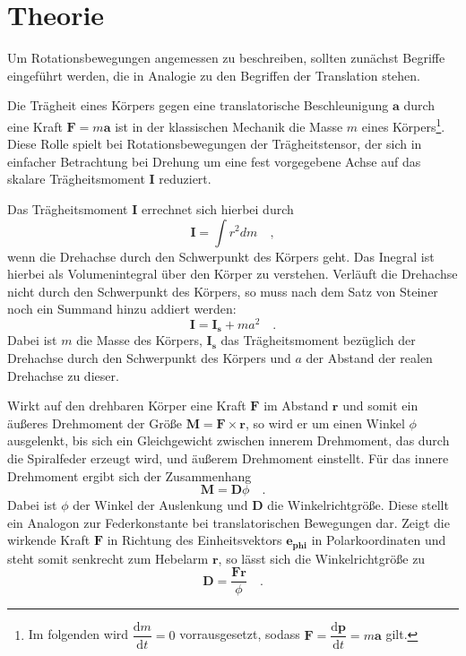 \section{Theorie}
\label{sec:Theorie}
Um Rotationsbewegungen angemessen zu beschreiben, sollten zunächst Begriffe
eingeführt werden, die in Analogie zu den Begriffen der Translation stehen.

Die Trägheit eines Körpers gegen eine translatorische Beschleunigung $\symbf{a}$
durch eine Kraft $\symbf{F}=m\symbf{a}$ ist in der klassischen Mechanik die
Masse $m$ eines Körpers\footnote{Im folgenden wird
$\dfrac{\mathrm{d}m}{\mathrm{d}t}=0$ vorrausgesetzt, sodass
$\symbf{F}=\dfrac{\mathrm{d}\symbf{p}}{\mathrm{d}t}=m\symbf{a}$ gilt.}.
Diese Rolle spielt bei Rotationsbewegungen der Trägheitstensor, der sich in
einfacher Betrachtung bei Drehung um eine fest vorgegebene Achse auf das skalare
Trägheitsmoment $\symbf{I}$ reduziert.

Das Trägheitsmoment $\symbf{I}$ errechnet sich hierbei durch
\begin{equation}
  \symbf{I}=\int r^2 dm\quad,
  \label{eqn:traegheitallg}
\end{equation}
wenn die Drehachse durch den Schwerpunkt des Körpers geht. Das Inegral ist hierbei
als Volumenintegral über den Körper zu verstehen. Verläuft die Drehachse nicht
durch den Schwerpunkt des Körpers, so muss nach dem Satz von Steiner noch ein
Summand hinzu addiert werden:
\begin{equation}
  \symbf{I}=\symbf{I_s}+ma^2\quad.
  \label{eqn:steiner}
\end{equation}
Dabei ist $m$ die Masse des Körpers, $\symbf{I_s}$ das Trägheitsmoment bezüglich
der Drehachse durch den Schwerpunkt des Körpers und $a$ der Abstand der realen
Drehachse zu dieser.

Wirkt auf den drehbaren Körper eine Kraft $\symbf{F}$ im Abstand $\symbf{r}$ und somit ein
äußeres Drehmoment der Größe $\symbf{M}=\symbf{F}\times\symbf{r}$, so wird er um
einen Winkel $\phi$ ausgelenkt, bis sich ein Gleichgewicht zwischen innerem Drehmoment,
das durch die Spiralfeder erzeugt wird, und äußerem Drehmoment einstellt. Für das innere
Drehmoment ergibt sich der Zusammenhang
\begin{equation}
  \symbf{M}=\symbf{D}\phi\quad.
  \label{eqn:drehmoment_innen}
\end{equation}
Dabei ist $\phi$ der Winkel der Auslenkung und $\symbf{D}$ die Winkelrichtgröße.
Diese stellt ein Analogon zur Federkonstante bei translatorischen Bewegungen dar.
Zeigt die wirkende Kraft $\symbf{F}$ in Richtung des Einheitsvektors $\symbf{e_{phi}}$
in Polarkoordinaten und steht somit senkrecht zum Hebelarm $\symbf{r}$, so lässt sich
die Winkelrichtgröße zu
\begin{equation}
  \symbf{D}=\frac{\symbf{F}\symbf{r}}{\phi}\quad.
  \label{eqn:winkelrg}
\end{equation}

